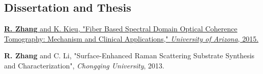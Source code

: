 \documentclass[letterpaper,10pt]{article}
\renewenvironment{itemize}{
  \begin{list}{}{
    \setlength{\leftmargin}{1.5em}
  }
}{
  \end{list}
}
\begin{document}
\subsection*{Dissertation and Thesis}

\begin{itemize}
\item \href{https://scholar.google.com/citations?view_op=view_citation&hl=en&user=PpPf3BoAAAAJ&citation_for_view=PpPf3BoAAAAJ:9yKSN-GCB0IC}{{\bf R. Zhang} and K. Kieu, "Fiber Based Spectral Domain Optical Coherence Tomography: Mechanism and Clinical Applications," {\it University of Arizona}, 2015.}

\item {\bf R. Zhang} and C. Li, "Surface-Enhanced Raman Scattering Substrate Synthesis and Characterization", {\it Chongqing University}, 2013.
\end{itemize}
\end{document}
